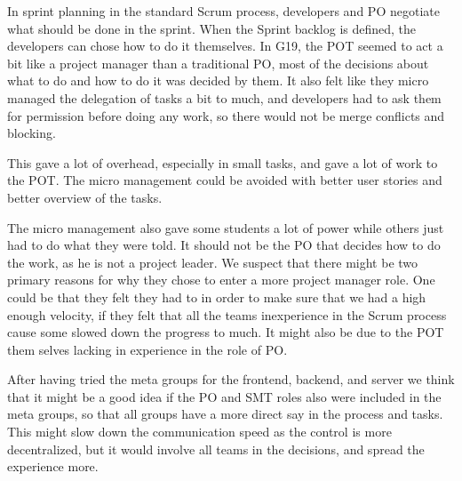 In sprint planning in the standard Scrum process, developers and PO negotiate what should be done in the sprint. When the Sprint backlog is defined, the developers can chose how to do it themselves. In \gls{G19}, the \Gls{POT} seemed to act a bit like a project manager than a traditional \gls{PO}, most of the decisions about what to do and how to do it was decided by them. It also felt like they micro managed the delegation of tasks a bit to much, and developers had to ask them for permission before doing any work, so there would not be merge conflicts and blocking.

This gave a lot of overhead, especially in small tasks, and gave a lot of work to the \gls{POT}. The micro management could be avoided with better user stories and better overview of the tasks.

The micro management also gave some students a lot of power while others just had to do what they were told. It should not be the PO that decides how to do the work, as he is not a project leader.
We suspect that there might be two primary reasons for why they chose to enter a more project manager role. One could be that they felt they had to in order to make sure that we had a high enough velocity, if they felt that all the teams inexperience in the Scrum process cause some slowed down the progress to much. It might also be due to the \gls{POT} them selves lacking in experience in the role of \gls{PO}.

After having tried the meta groups for the frontend, backend, and server we think that it might be a good idea if the \gls{PO} and \gls{SMT} roles also were included in the meta groups, so that all groups have a more direct say in the process and tasks. This might slow down the communication speed as the control is more decentralized, but it would involve all teams in the decisions, and spread the experience more. 
